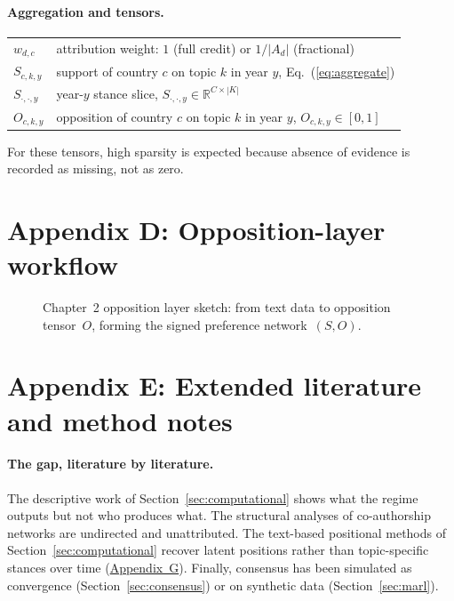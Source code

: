 \paragraph{Aggregation and tensors.}
\begin{tabular}{@{}ll@{}}
$w_{d,c}$           & attribution weight: $1$ (full credit) or $1/|A_d|$ (fractional) \\
$S_{c,k,y}$         & support of country $c$ on topic $k$ in year $y$, Eq.~(\ref{eq:aggregate}) \\
$S_{\cdot,\cdot,y}$ & year-$y$ stance slice, $S_{\cdot,\cdot,y}\in\mathbb{R}^{C\times|K|}$ \\
$O_{c,k,y}$         & opposition of country $c$ on topic $k$ in year $y$, $O_{c,k,y}\in[0,1]$ \\
\end{tabular}

For these tensors, high sparsity is expected because absence of evidence is recorded as missing, not as zero.

\section*{Appendix D: Opposition-layer workflow}
\label{app:d}

\begin{figure}[htbp]
  \centering
  \resizebox{\textwidth}{!}{}
  \caption{Chapter~2 opposition layer sketch: from text data to opposition tensor~$O$, forming the signed preference network~$(S,O)$.}
  \label{fig:ch2-workflow}
\end{figure}

\section*{Appendix E: Extended literature and method notes}
\label{app:e}

\paragraph{The gap, literature by literature.}
The descriptive work of Section~\ref{sec:computational} \parencite{Gardiner2025,Mancilla2023}
shows what the regime outputs but not who produces what. The structural analyses of co-authorship
networks \parencite{Botelho_CoalitionDynamics,Kumar_ConsistentPatterns} are undirected and
unattributed. The text-based positional methods of Section~\ref{sec:computational} recover latent
positions rather than topic-specific stances over time (\hyperref[app:g]{Appendix~G}). Finally,
consensus has been simulated as convergence (Section~\ref{sec:consensus}) or on synthetic data
(Section~\ref{sec:marl}).

